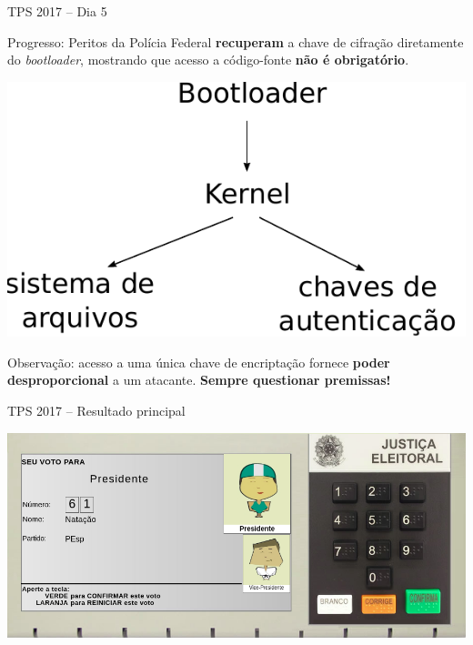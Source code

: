 \documentclass[10pt]{beamer}
\begin{document}
\begin{frame}{TPS 2017 -- Dia 5}

\alert{Progresso:} Peritos da Polícia Federal {\bf recuperam} a chave de cifração diretamente do \emph{bootloader}, mostrando que acesso a código-fonte {\bf não é obrigatório}.

\begin{center}
\includegraphics[scale=0.5]{cifracao.pdf}
\end{center}

\alert{Observação:} acesso a uma única chave de encriptação fornece {\bf poder desproporcional} a um atacante. {\bf Sempre questionar premissas!}

\end{frame}

\begin{frame}{TPS 2017 -- Resultado principal}

\includegraphics[width=\textwidth]{tela-original.png}

\end{frame}
\end{document}
